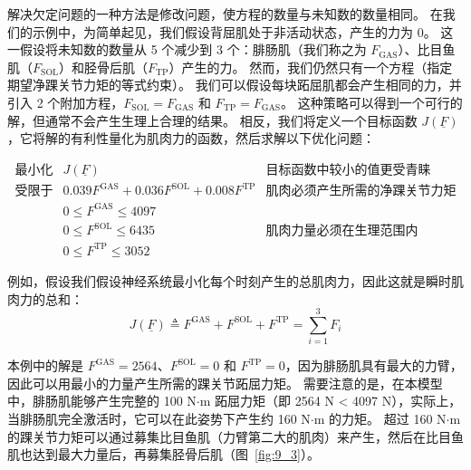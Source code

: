 解决欠定问题的一种方法是修改问题，使方程的数量与未知数的数量相同。
在我们的示例中，为简单起见，我们假设背屈肌处于非活动状态，产生的力为 0。
这一假设将未知数的数量从 5 个减少到 3 个：腓肠肌（我们称之为 $ F_\text{GAS} $）、比目鱼肌（$ F_\text{SOL} $）和胫骨后肌（$ F_\text{TP} $）产生的力。
然而，我们仍然只有一个方程（指定期望净踝关节力矩的等式约束）。
我们可以假设每块跖屈肌都会产生相同的力，并引入 2 个附加方程，$ F_\text{SOL} = F_\text{GAS} $ 和 $ F_\text{TP} = F_\text{GAS} $。
这种策略可以得到一个可行的解，但通常不会产生生理上合理的结果。
相反，我们将定义一个目标函数 $ J(\underline{F}) $，它将解的有利性量化为肌肉力的函数，然后求解以下优化问题：
%
\begin{proposition}

\begin{equation}
	\begin{aligned}
		\text{最小化} & J(\underline{F})  &  \text{目标函数中较小的值更受青睐} \\
		\text{受限于} & 0.039 F^\text{GAS} + 0.036 F^\text{SOL} + 0.008 F^\text{TP} & \text{肌肉必须产生所需的净踝关节力矩} \\
		& 0 \leq F^\text{GAS} \leq 4097 & \\
		& 0 \leq F^\text{SOL} \leq 6435 & \text{肌肉力量必须在生理范围内} \\
		& 0 \leq F^\text{TP} \leq 3052 &  \nonumber
	\end{aligned}
\end{equation}

\end{proposition}


例如，假设我们假设神经系统最小化每个时刻产生的总肌肉力，因此这就是瞬时肌肉力的总和：
%
\begin{equation}
	J ( \underline{F} ) 
		\triangleq
		F ^\text{GAS} + 
		F ^\text{SOL} + 
		F ^\text{TP} 
		= \sum_{i=1}^{3} F_i
	\label{eq:9_1}
\end{equation}

本例中的解是 $F^\text{GAS} = 2564$、$F^\text{SOL} = 0$ 和 $F^\text{TP} = 0$，因为腓肠肌具有最大的力臂，因此可以用最小的力量产生所需的踝关节跖屈力矩。
需要注意的是，在本模型中，腓肠肌能够产生完整的 100 N$\cdot$m 跖屈力矩（即 2564 N < 4097 N），实际上，当腓肠肌完全激活时，它可以在此姿势下产生约 160 N$\cdot$m 的力矩。
超过 160 N$\cdot$m 的踝关节力矩可以通过募集比目鱼肌（力臂第二大的肌肉）来产生，然后在比目鱼肌也达到最大力量后，再募集胫骨后肌（图~\ref{fig:9_3}）。

